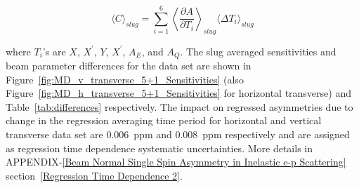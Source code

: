 \begin{equation} \label{equ:eqCorrection2}
\langle C\rangle_{slug} = \sum^{6}_{i=1} \left\langle \frac{\partial A }{\partial T_{i}}\right\rangle_{slug} \langle\Delta T_{i}\rangle_{slug}
\end{equation}

where $T_{i}$'s are $X$, $X^{\prime}$, $Y$, $X^{\prime}$, $A_{E}$, and  $A_{Q}$. The slug averaged sensitivities and beam parameter differences for the data set are shown in Figure~\ref{fig:MD_v_transverse_5+1_Sensitivities} (also Figure~\ref{fig:MD_h_transverse_5+1_Sensitivities} for horizontal transverse) and Table~\ref{tab:differences} respectively.
The impact on regressed asymmetries due to change in the regression averaging time period for horizontal and vertical transverse data set are 0.006~ppm and 0.008~ppm respectively and are assigned as regression time dependence systematic uncertainties. More details in APPENDIX-\ref{Beam Normal Single Spin Asymmetry in Inelastic e-p Scattering} section~\ref{Regression Time Dependence 2}.

%


